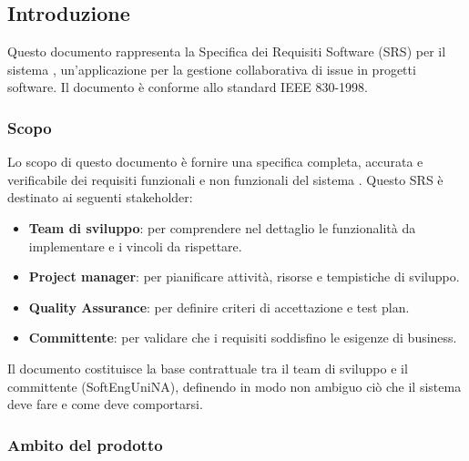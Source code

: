 \subsection{Introduzione}
\label{sec:introduzione}

Questo documento rappresenta la Specifica dei Requisiti Software (SRS) per il sistema \productname, un'applicazione per la gestione collaborativa di issue in progetti software. Il documento è conforme allo standard IEEE 830-1998.

\subsubsection{Scopo}
\label{subsec:scopo}

Lo scopo di questo documento è fornire una specifica completa, accurata e verificabile dei requisiti funzionali e non funzionali del sistema \productname. Questo SRS è destinato ai seguenti stakeholder:

\begin{itemize}[leftmargin=1.1em]
\item \textbf{Team di sviluppo}: per comprendere nel dettaglio le funzionalità da implementare e i vincoli da rispettare.
\item \textbf{Project manager}: per pianificare attività, risorse e tempistiche di sviluppo.
\item \textbf{Quality Assurance}: per definire criteri di accettazione e test plan.
\item \textbf{Committente}: per validare che i requisiti soddisfino le esigenze di business.
\end{itemize}

Il documento costituisce la base contrattuale tra il team di sviluppo e il committente (SoftEngUniNA), definendo in modo non ambiguo ciò che il sistema deve fare e come deve comportarsi.

\subsubsection{Ambito del prodotto}
\label{subsec:ambito}

